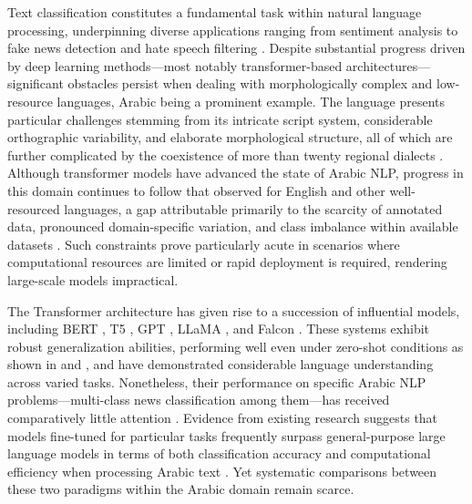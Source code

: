 \documentclass[sn-mathphys-num]{sn-jnl}
\begin{document}
Text classification constitutes a fundamental task within natural language processing, underpinning diverse applications ranging from sentiment analysis \cite{elnagar2021sentiment,bensoltane2022towards,bentrcia2025hybrid}  to fake news detection \cite{nassif2022arabic} and hate speech filtering \cite{elgendy2024toxicity, torfa2025enhancing}. Despite substantial progress driven by deep learning methods—most notably transformer-based architectures—significant obstacles persist when dealing with morphologically complex and low-resource languages, Arabic being a prominent example. The language presents particular challenges stemming from its intricate script system, considerable orthographic variability, and elaborate morphological structure, all of which are further complicated by the coexistence of more than twenty regional dialects \cite{helwe2020semi, talafha2020multi}. Although transformer models have advanced the state of Arabic NLP, progress in this domain continues to follow that observed for English and other well-resourced languages, a gap attributable primarily to the scarcity of annotated data, pronounced domain-specific variation, and class imbalance within available datasets \cite{alhawarat2020superior, almuzaini2020impact}. Such constraints prove particularly acute in scenarios where computational resources are limited or rapid deployment is required, rendering large-scale models impractical.

The Transformer architecture \cite{vaswani2017attention} has given rise to a succession of influential models, including BERT \cite{devlin2018bert}, T5 \cite{roberts2019exploring}, GPT \cite{DBLP:journals/corr/abs-2005-14165}, LLaMA \cite{touvron2023llama}, and Falcon \cite{almazrouei2023falcon}. These systems exhibit robust generalization abilities, performing well even under zero-shot conditions as shown in \cite{DBLP:journals/corr/abs-1909-00161} and \cite{gera2022zero}, and have demonstrated considerable language understanding across varied tasks. Nonetheless, their performance on specific Arabic NLP problems—multi-class news classification among them—has received comparatively little attention \cite{wahdan2024systematic}. Evidence from existing research suggests that models fine-tuned for particular tasks frequently surpass general-purpose large language models in terms of both classification accuracy and computational efficiency when processing Arabic text \cite{alruily2023automated, nassif2022arabic}. Yet systematic comparisons between these two paradigms within the Arabic domain remain scarce.
\end{document}
